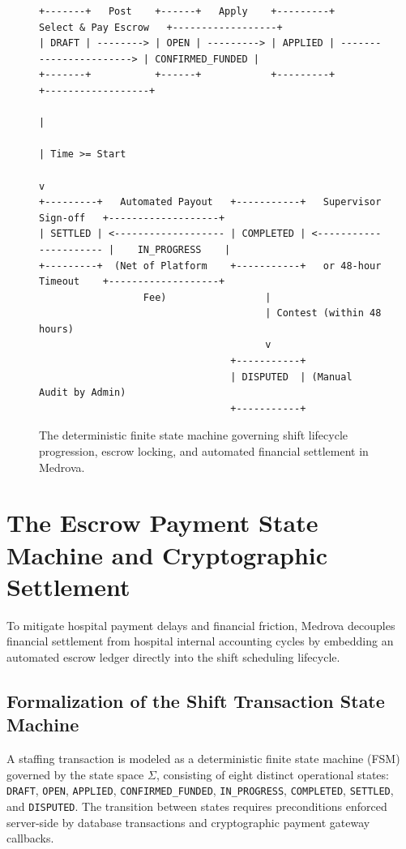 \documentclass[conference]{IEEEtran}
\begin{document}
\begin{figure}[t]
\begin{center}
\begingroup
\scriptsize
\begin{minipage}{0.90\textwidth}
\begin{verbatim}
+-------+   Post    +------+   Apply    +---------+   Select & Pay Escrow   +------------------+
| DRAFT | --------> | OPEN | ---------> | APPLIED | -----------------------> | CONFIRMED_FUNDED |
+-------+           +------+            +---------+                          +------------------+
                                                                                       |
                                                                                       | Time >= Start
                                                                                       v
+---------+   Automated Payout   +-----------+   Supervisor Sign-off   +-------------------+
| SETTLED | <------------------- | COMPLETED | <---------------------- |    IN_PROGRESS    |
+---------+  (Net of Platform    +-----------+   or 48-hour Timeout    +-------------------+
                  Fee)                 |
                                       | Contest (within 48 hours)
                                       v
                                 +-----------+
                                 | DISPUTED  | (Manual Audit by Admin)
                                 +-----------+
\end{verbatim}
\end{minipage}
\endgroup
\caption{The deterministic finite state machine governing shift lifecycle progression, escrow locking, and automated financial settlement in Medrova.}
\label{fig:state_machine}
\end{center}
\end{figure}

\section{The Escrow Payment State Machine and Cryptographic Settlement}
To mitigate hospital payment delays and financial friction, Medrova decouples financial settlement from hospital internal accounting cycles by embedding an automated escrow ledger directly into the shift scheduling lifecycle.

\subsection{Formalization of the Shift Transaction State Machine}
A staffing transaction is modeled as a deterministic finite state machine (FSM) governed by the state space $\Sigma$, consisting of eight distinct operational states: \texttt{DRAFT}, \texttt{OPEN}, \texttt{APPLIED}, \texttt{CONFIRMED\_FUNDED}, \texttt{IN\_PROGRESS}, \texttt{COMPLETED}, \texttt{SETTLED}, and \texttt{DISPUTED}. The transition between states requires preconditions enforced server-side by database transactions and cryptographic payment gateway callbacks.
\end{document}
